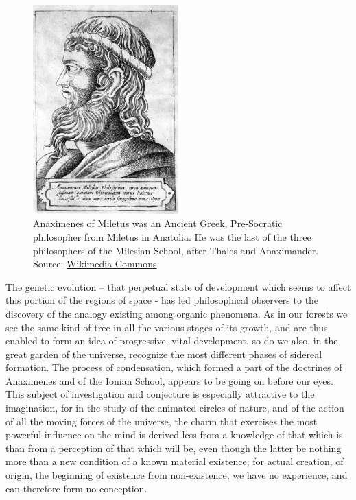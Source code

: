 \clearpage
\begin{figure}
   \centering
   \includegraphics[width=0.5\textwidth]{../../pictures/Anaximenes_Milesius_-_Illustrium_philosophorum_et_sapientum_effigies_ab_eorum_numistatibus_extractae.png}
   \captionsetup{width=0.5\textwidth}
   \caption{\footnotesize Anaximenes of Miletus was an Ancient Greek, Pre-Socratic philosopher from Miletus in Anatolia. He was the last of the three philosophers of the Milesian School, after Thales and Anaximander. Source: \href{https://commons.wikimedia.org/wiki/File:Anaximenes_Milesius_-_Illustrium_philosophorum_et_sapientum_effigies_ab_eorum_numistatibus_extractae.png}{Wikimedia Commons}.}
   \vspace{-16pt}
\end{figure}

The genetic evolution -- that perpetual state of development which seems to affect this portion of the regions of space - has led philosophical observers to the discovery of the analogy existing among organic phenomena. As in our forests we see the same kind of tree in all the various stages of its growth, and are thus enabled to form an idea of progressive, vital development, so do we also, in the great garden of the universe, recognize the most different phases of sidereal formation. The process of condensation, which formed a part of the doctrines of Anaximenes and of the Ionian School, appears to be going on before our eyes. This subject of investigation and conjecture is especially attractive to the imagination, for in the study of the animated circles of nature, and of the action of all the moving forces of the universe, the charm that exercises the most powerful influence on the mind is derived less from a knowledge of that which is than from a perception of that which will be, even though the latter be nothing more than a new condition of a known material existence; for actual creation, of origin, the beginning of existence from non-existence, we have no experience, and can therefore form no conception.


